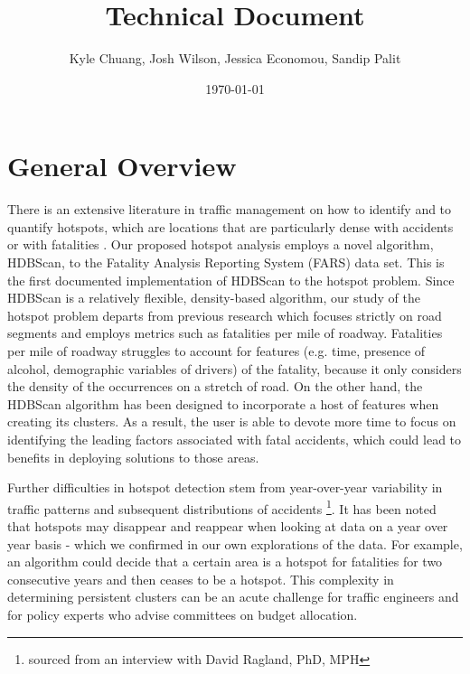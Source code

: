 \documentclass{article}
\begin{document}
\title{Technical Document}
\date{\today}
\author{Kyle Chuang, Josh Wilson, Jessica Economou, Sandip Palit}

\section{General Overview}
 There is an extensive literature in traffic management on how to identify and to quantify hotspots, which are locations that are particularly dense with accidents or with fatalities \cite{dougru2015comparison, zhang2018dijkstra, steenberghen2004intra}. Our proposed hotspot analysis employs a novel algorithm, HDBScan, to the Fatality Analysis Reporting System (FARS) data set. This is the first documented implementation of HDBScan to the hotspot problem. Since HDBScan is a relatively flexible, density-based algorithm, our study of the hotspot problem departs from previous research which focuses strictly on road segments and employs metrics such as fatalities per mile of roadway. Fatalities per mile of roadway struggles to account for features (e.g. time, presence of alcohol, demographic variables of drivers) of the fatality, because it only considers the density of the occurrences on a stretch of road. On the other hand, the HDBScan algorithm has been designed to incorporate a host of features when creating its clusters. As a result, the user is able to devote more time to focus on identifying the leading factors associated with fatal accidents, which could lead to benefits in deploying solutions to those areas.

Further difficulties in hotspot detection stem from year-over-year variability in traffic patterns and subsequent distributions of accidents \footnote {sourced from an interview with David Ragland, PhD, MPH}. It has been noted that hotspots may disappear and reappear when looking at data on a year over year basis - which we confirmed in our own explorations of the data. For example, an algorithm could decide that a certain area is a hotspot for fatalities for two consecutive years and then ceases to be a hotspot. This complexity in determining persistent clusters can be an acute challenge for traffic engineers and for policy experts who advise committees on budget allocation.
\end{document}
